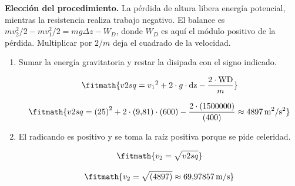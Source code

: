 \noindent\textbf{Elección del procedimiento.} La pérdida de altura libera energía potencial, mientras la resistencia realiza trabajo negativo. El balance es $mv_2^2/2-mv_1^2/2=mg\Delta z-W_D$, donde $W_D$ es aquí el módulo positivo de la pérdida. Multiplicar por $2/m$ deja el cuadrado de la velocidad.

\begin{enumerate}

\item Sumar la energía gravitatoria y restar la disipada con el signo indicado.

\[\fitmath{v2sq={v_{1}}^{2}+2\cdot g\cdot \mathrm{dz}-\frac{2\cdot \mathrm{WD}}{m}}\]

\[\fitmath{v2sq={(25)}^{2}+2\cdot (9{,}81)\cdot (600)-\frac{2\cdot (1500000)}{(400)}\approx 4897\,\mathrm{m^{2}/s^{2}}}\]

\item El radicando es positivo y se toma la raíz positiva porque se pide celeridad.

\[\fitmath{v_{2}=\sqrt{v2sq}}\]

\[\fitmath{v_{2}=\sqrt{(4897)}\approx 69{,}97857\,\mathrm{m/s}}\]

\end{enumerate}
